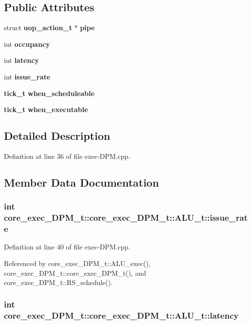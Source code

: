 \subsection*{Public Attributes}
\begin{CompactItemize}
\item 
struct {\bf uop\_\-action\_\-t} $\ast$ {\bf pipe}
\item 
int {\bf occupancy}
\item 
int {\bf latency}
\item 
int {\bf issue\_\-rate}
\item 
{\bf tick\_\-t} {\bf when\_\-scheduleable}
\item 
{\bf tick\_\-t} {\bf when\_\-executable}
\end{CompactItemize}


\subsection{Detailed Description}


Definition at line 36 of file exec-DPM.cpp.

\subsection{Member Data Documentation}
\subsubsection[{issue\_\-rate}]{\setlength{\rightskip}{0pt plus 5cm}int core\_\-exec\_\-DPM\_\-t::core\_\-exec\_\-DPM\_\-t::ALU\_\-t::issue\_\-rate}\label{structcore__exec__DPM__t_1_1ALU__t_a565898e067059987f9836d533bffbe9}




Definition at line 40 of file exec-DPM.cpp.

Referenced by core\_\-exec\_\-DPM\_\-t::ALU\_\-exec(), core\_\-exec\_\-DPM\_\-t::core\_\-exec\_\-DPM\_\-t(), and core\_\-exec\_\-DPM\_\-t::RS\_\-schedule().
\subsubsection[{latency}]{\setlength{\rightskip}{0pt plus 5cm}int core\_\-exec\_\-DPM\_\-t::core\_\-exec\_\-DPM\_\-t::ALU\_\-t::latency}\label{structcore__exec__DPM__t_1_1ALU__t_a143f618af8681b59955becaf7c0e8e0}




